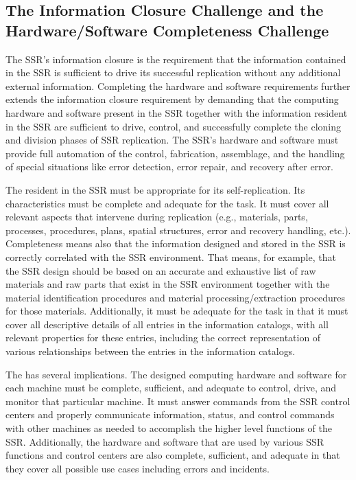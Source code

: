 \subsection[The Information Closure Challenge and the Hardware/Software
Completeness Challenge]{The Information Closure Challenge and the
Hardware/Software Completeness Challenge}

The SSR's information closure 
is the requirement that the information contained in the SSR is
sufficient to drive its successful replication without any additional
external information. Completing the hardware and software
requirements further extends the information closure
requirement by demanding that the computing hardware and software
present in the SSR together with the information resident in the SSR
are sufficient to drive, control, and successfully complete the cloning
and division phases of SSR replication. The SSR's hardware and
software must provide full automation of the control, fabrication,
assemblage, and the handling of special situations like error detection,
error repair, and recovery after error.

The  resident in the SSR must be
appropriate for its self-replication. Its characteristics must be complete and adequate for the task. It must cover all relevant aspects that intervene during replication (e.g., materials, parts, processes, procedures, plans, spatial structures, error and recovery handling, etc.). Completeness means also that the information designed and stored in the SSR is correctly correlated with the SSR environment. That means, for example, that the SSR design should be based on an accurate and exhaustive list of raw materials and raw parts that exist in the SSR environment together with the material identification procedures and material processing/extraction procedures for those materials. Additionally, it must be adequate for the task in that it must cover all descriptive details of all entries in the information catalogs, with all relevant properties for these entries, including the correct representation of various relationships between the entries in the information catalogs.

The  has several implications. The designed computing hardware and software for each machine must be complete, sufficient, and adequate to control, drive, and monitor that particular machine. It must answer commands from the SSR control centers and properly communicate information, status, and control commands with other machines as needed to accomplish the higher level functions of the SSR. Additionally, the hardware and software that are used by various SSR functions and control centers are also complete, sufficient, and adequate in that they cover all possible use cases including errors and incidents.

